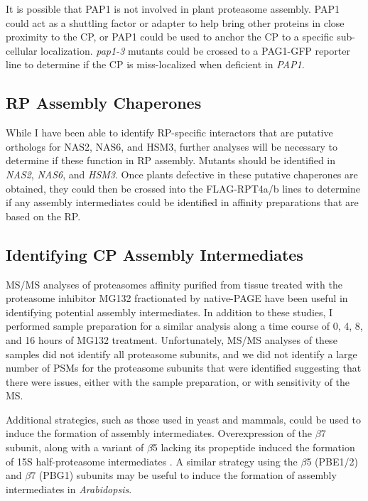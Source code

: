 	It is possible that PAP1 is not involved in plant proteasome assembly. PAP1 could act as a shuttling factor or adapter to help bring other proteins in close proximity to the CP, or PAP1 could be used to anchor the CP to a specific sub-cellular localization. \textit{pap1-3} mutants could be crossed to a PAG1-GFP reporter line \citep{marshall15} to determine if the CP is miss-localized when deficient in \textit{PAP1}. 
	
\subsection{RP Assembly Chaperones}
	While I have been able to identify RP-specific interactors that are putative orthologs for NAS2, NAS6, and HSM3, further analyses will be necessary to determine if these function in RP assembly.  Mutants should be identified in \textit{NAS2}, \textit{NAS6}, and \textit{HSM3}. Once plants defective in these putative chaperones are obtained, they could then be crossed into the FLAG-RPT4a/b lines to determine if any assembly intermediates could be identified in affinity preparations that are based on the RP. 
	
\subsection{Identifying CP Assembly Intermediates}
	 MS/MS analyses of proteasomes affinity purified from tissue treated with the proteasome inhibitor MG132 fractionated by native-PAGE have been useful in identifying potential assembly intermediates.  In addition to these studies, I performed sample preparation for a similar analysis along a time course of 0, 4, 8, and 16 hours of MG132 treatment. Unfortunately, MS/MS analyses of these samples did not identify all proteasome subunits, and we did not identify a large number of PSMs for the proteasome subunits that were identified suggesting that there were issues, either with the sample preparation, or with sensitivity of the MS.
	 
	Additional strategies, such as those used in yeast and mammals, could be used to induce the formation of assembly intermediates. Overexpression of the $\beta$7 subunit, along with a variant of $\beta$5 lacking its propeptide induced the formation of 15S half-proteasome intermediates \citep{li07}. A similar strategy using the $\beta$5 (PBE1/2) and $\beta$7 (PBG1) subunits may be useful to induce the formation of assembly intermediates in \textit{Arabidopsis}. 

